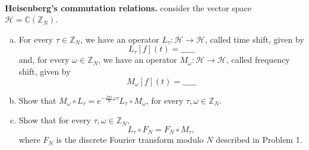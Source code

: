\documentclass{article}
\def\zz{{\mathbb Z}}
\def\cc{{\mathbb C}}
\begin{document}
\begin{problem} \\ 
    \textbf{Heisenberg's commutation relations.} consider the vector space $\mathscr{H} = \cc(\zz_N)$.
    \begin{enumerate}[(a)]
        \item For every $\tau \in \zz_N$, we have an operator $L_\tau : \mathscr{H} \to \mathscr{H}$, called time shift, given by
        \begin{equation*}
            L_\tau[f](t) = \_\_\_\_\_
        \end{equation*}
        and, for every $\omega \in \zz_N$, we have an operator $M_\omega : \mathscr{H} \to \mathscr{H}$, called frequency shift, given by
        \begin{equation*}
            M_\omega[f](t) = \_\_\_\_\_
        \end{equation*}
        \item Show that $M_\omega \circ L_\tau = e^{-\frac{2 \pi i}{N} \omega \tau} L_\tau \circ M_\omega$, for every $\tau, \omega \in \zz_N$.
        \item Show that for every $\tau, \omega \in \zz_N$, 
        \begin{equation*}
            L_\tau \circ F_N = F_N \circ M_\tau,
        \end{equation*}
        where $F_N$ is the discrete Fourier transform modulo $N$ described in Problem 1.
    \end{enumerate}
\end{problem}


\end{document}
